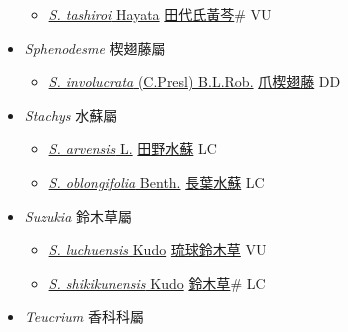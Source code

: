 \begin{itemize}
\begin{itemize}
        \item[] \href{http://www.theplantlist.org/tpl1.1/search?q=Scutellaria+tashiroi}{\textit{S. tashiroi} Hayata}   \href{\detokenize{http://taibnet.sinica.edu.tw/chi/taibnet_species_list.php?T2=田代氏黃芩&T2_new_value=true&fr=y}}{田代氏黃芩}\# VU
  \end{itemize}
 \item[] \textit{Sphenodesme} 楔翅藤屬
                    
  \begin{itemize}
        \item[] \href{http://www.theplantlist.org/tpl1.1/search?q=Sphenodesme+involucrata}{\textit{S. involucrata} (C.Presl) B.L.Rob.}   \href{\detokenize{http://taibnet.sinica.edu.tw/chi/taibnet_species_list.php?T2=爪楔翅藤&T2_new_value=true&fr=y}}{爪楔翅藤} DD
  \end{itemize}
 \item[] \textit{Stachys} 水蘇屬
                    
  \begin{itemize}
        \item[] \href{http://www.theplantlist.org/tpl1.1/search?q=Stachys+arvensis}{\textit{S. arvensis} L.}   \href{\detokenize{http://taibnet.sinica.edu.tw/chi/taibnet_species_list.php?T2=田野水蘇&T2_new_value=true&fr=y}}{田野水蘇} LC
        \item[] \href{http://www.theplantlist.org/tpl1.1/search?q=Stachys+oblongifolia}{\textit{S. oblongifolia} Benth.}   \href{\detokenize{http://taibnet.sinica.edu.tw/chi/taibnet_species_list.php?T2=長葉水蘇&T2_new_value=true&fr=y}}{長葉水蘇} LC
  \end{itemize}
 \item[] \textit{Suzukia} 鈴木草屬
                    
  \begin{itemize}
        \item[] \href{http://www.theplantlist.org/tpl1.1/search?q=Suzukia+luchuensis}{\textit{S. luchuensis} Kudo}   \href{\detokenize{http://taibnet.sinica.edu.tw/chi/taibnet_species_list.php?T2=琉球鈴木草&T2_new_value=true&fr=y}}{琉球鈴木草} VU
        \item[] \href{http://www.theplantlist.org/tpl1.1/search?q=Suzukia+shikikunensis}{\textit{S. shikikunensis} Kudo}   \href{\detokenize{http://taibnet.sinica.edu.tw/chi/taibnet_species_list.php?T2=鈴木草&T2_new_value=true&fr=y}}{鈴木草}\# LC
  \end{itemize}
 \item[] \textit{Teucrium} 香科科屬
                    

\end{itemize}
